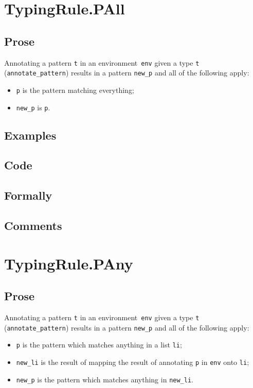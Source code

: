 \documentclass{book}
\begin{document}
\section{TypingRule.PAll \label{sec:TypingRule.PAll}}

  \subsection{Prose}
   Annotating a pattern \texttt{t} in an environment~\texttt{env} given a type \texttt{t} (\texttt{annotate\_pattern}) results in a pattern \texttt{new\_p} and all of the following apply:
   \begin{itemize}
   \item \texttt{p} is the pattern matching everything;
   \item \texttt{new\_p} is \texttt{p}.
   \end{itemize}

  \subsection{Examples}

  \subsection{Code}

  \subsection{Formally}

  \subsection{Comments}

\section{TypingRule.PAny\label{sec:TypingRule.PAny}}

  \subsection{Prose}
   Annotating a pattern \texttt{t} in an environment~\texttt{env} given a type \texttt{t} (\texttt{annotate\_pattern}) results in a pattern \texttt{new\_p} and all of the following apply:
   \begin{itemize}
   \item \texttt{p} is the pattern which matches anything in a list \texttt{li};
   \item \texttt{new\_li} is the result of mapping the result of annotating \texttt{p} in \texttt{env} onto \texttt{li};
   \item \texttt{new\_p} is the pattern which matches anything in \texttt{new\_li}.
   \end{itemize}
\end{document}
